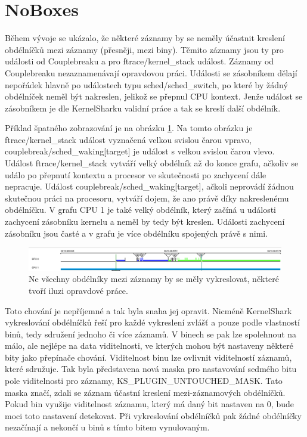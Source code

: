\section{NoBoxes}

Během vývoje se ukázalo, že některé záznamy by se neměly účastnit kreslení obdélníčků mezi záznamy (přesněji, mezi biny). Těmito záznamy jsou ty pro události od Couplebreaku a pro ftrace/kernel\_stack událost. Záznamy od Couplebreaku nezaznamenávají opravdovou práci. Události se zásobníkem dělají nepořádek hlavně po událostech typu sched/sched\_switch, po které by žádný obdélníček neměl být nakreslen, jelikož se přepnul CPU kontext. Jenže událost se zásobníkem je dle KernelSharku validní práce a tak se kreslí další obdélník.

Příklad špatného zobrazování je na obrázku \ref{obr03:modif-noboxes-bad}. Na tomto obrázku je ftrace/kernel\_stack událost vyznačená velkou svislou čarou vpravo, couplebreak/sched\_waking[target] je událost s velkou svislou čarou vlevo. Událost ftrace/kernel\_stack vytváří velký obdélník až do konce grafu, ačkoliv se událo po přepnutí kontextu a procesor ve skutečnosti po zachycení dále nepracuje. Událost couplebreak/sched\_waking[target], ačkoli neprovádí žádnou skutečnou práci na procesoru, vytváří dojem, že ano právě díky nakreslenému obdélníčku. V grafu CPU 1 je také velký obdélník, který začíná u události zachycení zásobníku kernelu a neměl by tedy být kreslen. Události zachycení zásobníku jsou časté a v grafu je více obdélníku spojených právě s nimi.

\begin{figure}[p]\centering
    \includegraphics[width=140mm]{img/modif-noboxes-bad}
    \caption{Ne všechny obdélníky mezi záznamy by se měly vykreslovat, některé tvoří iluzi opravdové práce.}
    \label{obr03:modif-noboxes-bad}
\end{figure}

Toto chování je nepříjemné a tak byla snaha jej opravit. Nicméně KernelShark vykreslování obdélníčků řeší pro každé vykreslení zvlášť a pouze podle vlastností binů, tedy sdružení jednoho či více záznamů. V binech se pak lze spolehnout na málo, ale nejlépe na data viditelnosti, ve kterých mohou být nastaveny některé bity jako přepínače chování. Viditelnost binu lze ovlivnit viditelností záznamů, které sdružuje. Tak byla představena nová maska pro nastavování sedmého bitu pole viditelnosti pro záznamy, KS\_PLUGIN\_UNTOUCHED\_MASK. Tato maska značí, zdali se záznam účastní kreslení mezi-záznamových obdélníčků. Pokud bin využije viditelnost záznamu, který má daný bit nastaven na 0, bude moci toto nastavení detekovat. Při vykreslování obdélníčků pak žádné obdélníčky nezačínají a nekončí u binů s tímto bitem vynulovaným.

